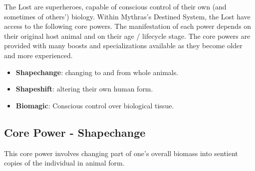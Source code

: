 \documentclass[letterpaper,serif]{rpg-module}
\begin{document}
The Lost are superheroes, capable of conscious control of their own (and sometimes of others') biology.  Within Mythras's Destined System, the Lost have access to the following core powers. The manifestation of each power depends on their original host animal and on their age / lifecycle stage. The core powers are provided with many boosts and specializations available as they become older and more experienced.

\begin{itemize}
    \item \textbf{Shapechange}: changing to and from whole animals.
    \item \textbf{Shapeshift}: altering their own human form. 
    \item \textbf{Biomagic}: Conscious control over biological tissue.
\end{itemize}



\subsection{Core Power - Shapechange }

This core power involves changing part of one's overall biomass into sentient copies of the individual in animal form.
\end{document}
